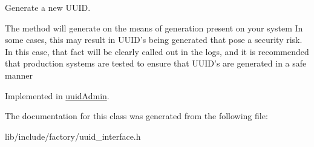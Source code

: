 Generate a new U\-U\-I\-D. 

The method will generate on the means of generation present on your system In some cases, this may result in U\-U\-I\-D's being generated that pose a security risk. In this case, that fact will be clearly called out in the logs, and it is recommended that production systems are tested to ensure that U\-U\-I\-D's are generated in a safe manner 

Implemented in \hyperlink{classuuidAdmin_a344f39f4c1e15cf72e64b3544312d7ed}{uuid\-Admin}.



The documentation for this class was generated from the following file\-:\begin{DoxyCompactItemize}
\item 
lib/include/factory/uuid\-\_\-interface.\-h\end{DoxyCompactItemize}
